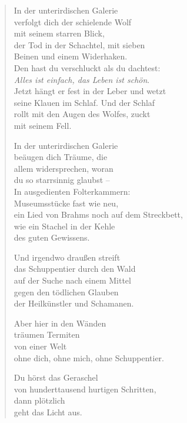 
\cleartoverso


\begin{verse}

In der unterirdischen Galerie\\
verfolgt dich der schielende Wolf\\
mit seinem starren Blick,\\
der Tod in der Schachtel, mit sieben\\
Beinen und einem Widerhaken.\\
Den hast du verschluckt als du dachtest:\\
\emph{Alles ist einfach, das Leben ist schön}.\\
Jetzt hängt er fest in der Leber und wetzt\\
seine Klauen im Schlaf. Und der Schlaf\\
rollt mit den Augen des Wolfes, zuckt\\
mit seinem Fell.

In der unterirdischen Galerie\\
beäugen dich Träume, die\\
allem widersprechen, woran\\
du so starrsinnig glaubst --\\
In ausgedienten Folterkammern:\\
Museumsstücke fast wie neu,\\
ein Lied von Brahms noch auf dem Streckbett,\\
wie ein Stachel in der Kehle\\
des guten Gewissens.

Und irgendwo draußen streift\\
das Schuppentier durch den Wald\\
auf der Suche nach einem Mittel\\
gegen den tödlichen Glauben\\
der Heilkünstler und Schamanen.

Aber hier in den Wänden\\
träumen Termiten\\
von einer Welt\\
ohne dich, ohne mich, ohne Schuppentier.

Du hörst das Geraschel\\
von hunderttausend hurtigen Schritten,\\
dann plötzlich\\
geht das Licht aus.

\end{verse}

